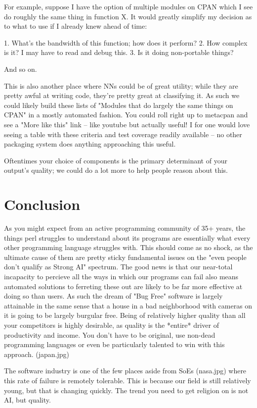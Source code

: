 \documentclass[twoside]{article}
\begin{document}
For example, suppose I have the option of multiple modules on CPAN which I see do roughly the same thing in function X.
It would greatly simplify my decision as to what to use if I already knew ahead of time:

1. What's the bandwidth of this function; how does it perform?
2. How complex is it?  I may have to read and debug this.
3. Is it doing non-portable things?

And so on.

This is also another place where NNs could be of great utility; while they are pretty awful at writing code, they're pretty great at classifying it.
As such we could likely build these lists of "Modules that do largely the same things on CPAN" in a mostly automated fashion.
You could roll right up to metacpan and see a "More like this" link -- like youtube but actually useful!
I for one would love seeing a table with these criteria and test coverage readily available -- no other packaging system does anything approaching this useful.

Oftentimes your choice of components is the primary determinant of your output's quality; we could do a lot more to help people reason about this.

\section{Conclusion}

As you might expect from an active programming community of 35+ years, the things perl struggles to understand about its programs are essentially what every other programming language struggles with.
This should come as no shock, as the ultimate cause of them are pretty sticky fundamental issues on the "even people don't qualify as Strong AI" spectrum.
The good news is that our near-total incapacity to percieve all the ways in which our programs can fail also means automated solutions to ferreting these out are likely to be far more effective at doing so than users.
As such the dream of "Bug Free" software is largely attainable in the same sense that a house in a bad neighborhood with cameras on it is going to be largely burgular free.
Being of relatively higher quality than all your competitors is highly desirable, as quality is the *entire* driver of productivity and income.
You don't have to be original, use non-dead programming languages or even be particularly talented to win with this approach. (japan.jpg)

The software industry is one of the few places aside from SoEs (nasa.jpg) where this rate of failure is remotely tolerable.
This is because our field is still relatively young, but that is changing quickly.
The trend you need to get religion on is not AI, but quality.
\end{document}
